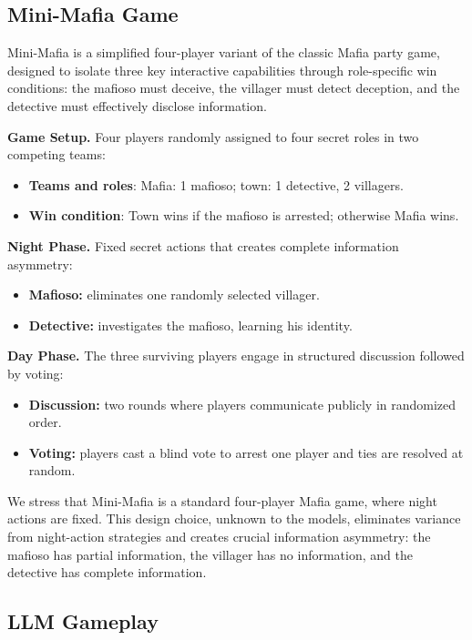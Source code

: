 \documentclass{article}
\begin{document}
\subsection{Mini-Mafia Game}

Mini-Mafia is a simplified four-player variant of the classic Mafia party game, designed to isolate three key interactive capabilities through role-specific win conditions: the mafioso must deceive, the villager must detect deception, and the detective must effectively disclose information.

\textbf{Game Setup.} Four players randomly assigned to four secret roles in two competing teams:
  \begin{itemize}
    \item \textbf{Teams and roles}: Mafia: 1 mafioso; town: 1 detective, 2 villagers.
    \item \textbf{Win condition}: Town wins if the mafioso is arrested; otherwise Mafia wins.
  \end{itemize}

\textbf{Night Phase.} Fixed secret actions that creates complete information asymmetry:
  \begin{itemize}
    \item \textbf{Mafioso:} eliminates one randomly selected villager.
    \item \textbf{Detective:} investigates the mafioso, learning his identity.
  \end{itemize}
  
\textbf{Day Phase.} The three surviving players engage in structured discussion followed by voting:
  \begin{itemize}
    \item \textbf{Discussion:} two rounds where players communicate publicly in randomized order.
    \item \textbf{Voting:} players cast a blind vote to arrest one player and ties are resolved at random.
  \end{itemize}

We stress that Mini-Mafia is a standard four-player Mafia game, where night actions are fixed. This design choice, unknown to the models, eliminates variance from night-action strategies and creates crucial information asymmetry: the mafioso has partial information, the villager has no information, and the detective has complete information.

\subsection{LLM Gameplay}
\end{document}
